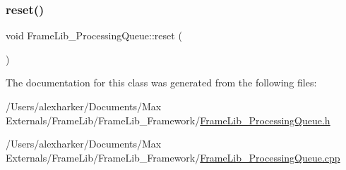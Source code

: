 \mbox{\label{class_frame_lib___processing_queue_a5550993e0c39bb9d6075fdf6d5aec956}} 
\subsubsection{\texorpdfstring{reset()}{reset()}}
{\footnotesize\ttfamily void Frame\+Lib\+\_\+\+Processing\+Queue\+::reset (\begin{DoxyParamCaption}{ }\end{DoxyParamCaption})\hspace{0.3cm}{\ttfamily [inline]}}



The documentation for this class was generated from the following files\+:\begin{DoxyCompactItemize}
\item 
/\+Users/alexharker/\+Documents/\+Max Externals/\+Frame\+Lib/\+Frame\+Lib\+\_\+\+Framework/\hyperlink{_frame_lib___processing_queue_8h}{Frame\+Lib\+\_\+\+Processing\+Queue.\+h}\item 
/\+Users/alexharker/\+Documents/\+Max Externals/\+Frame\+Lib/\+Frame\+Lib\+\_\+\+Framework/\hyperlink{_frame_lib___processing_queue_8cpp}{Frame\+Lib\+\_\+\+Processing\+Queue.\+cpp}\end{DoxyCompactItemize}
